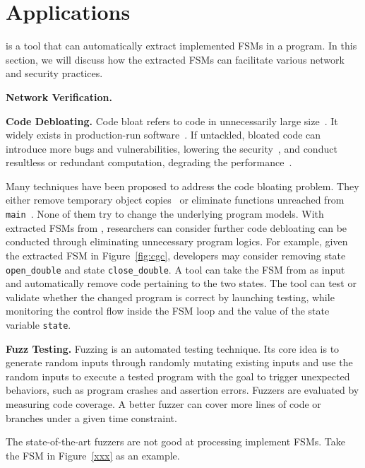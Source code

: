 \section{Applications}

\Tool{} is a tool that can automatically extract implemented FSMs in a program. 
In this section, we will discuss how the extracted FSMs can facilitate 
various network and security practices.  


\noindent\textbf{Network Verification.}

\noindent\textbf{Code Debloating.}
Code bloat refers to code in unnecessarily large size~\cite{code-bloat}.
It widely exists in production-run software~\cite{code-bloat-study}. 
If untackled, bloated code can introduce more bugs and vulnerabilities, 
lowering the security~\cite{protocol-mao}, 
and conduct resultless or redundant computation, 
degrading the performance~\cite{BloatFSE2008,XuBloatPLDI2009,XuBloatPLDI2010}. 

Many techniques have been proposed to address the code bloating problem. 
They either remove temporary object copies~\cite{BloatFSE2008,XuBloatPLDI2009,
XuBloatPLDI2010,Reusable,Cachetor} 
or eliminate functions unreached from 
\texttt{main}~\cite{container-debloating-1, 
container-debloating-2, dinghao-1}. 
None of them try to change the underlying program models.
With extracted FSMs from \Tool{}, researchers can consider 
further code debloating can be conducted through
eliminating unnecessary program logics. 
For example, given the extracted FSM in Figure~\ref{fig:cgc}, 
developers may consider removing state \texttt{open\_double} and 
state \texttt{close\_double}. 
A tool can take the FSM from \Tool{} as input and automatically 
remove code pertaining to the two states. 
The tool can test or validate whether the changed program is correct 
by launching testing, while monitoring the control flow 
inside the FSM loop and the value of the state variable \texttt{state}.

\noindent\textbf{Fuzz Testing.}
Fuzzing is an automated testing technique. Its core idea is 
to generate random inputs through randomly mutating existing inputs and 
use the random inputs to execute 
a tested program with the goal to trigger unexpected behaviors,
such as program crashes and assertion errors.
Fuzzers are evaluated by measuring code coverage. 
A better fuzzer can cover more lines of code 
or branches under a given time constraint. 

The state-of-the-art fuzzers are not good at processing 
implement FSMs.
Take the FSM in Figure~\ref{xxx} as an example. 

